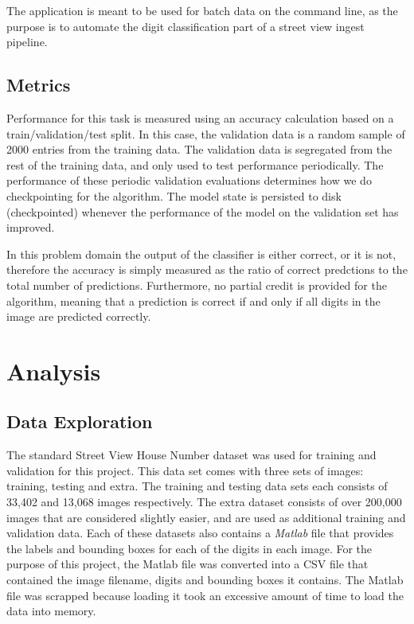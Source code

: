 \documentclass[12pt]{article}
\begin{document}
The application is meant to be used for batch data on the command line, as the purpose is to automate the digit classification part of a street view ingest pipeline.

\subsection{Metrics}
Performance for this task is measured using an accuracy calculation based on a train/validation/test split.
In this case, the validation data is a random sample of 2000 entries from the training data.
The validation data is segregated from the rest of the training data, and only used to test performance periodically.
The performance of these periodic validation evaluations determines how we do checkpointing for the algorithm.
The model state is persisted to disk (checkpointed) whenever the performance of the model on the validation set has improved.

In this problem domain the output of the classifier is either correct, or it is not, therefore the accuracy is simply measured as the ratio of correct predctions to the total number of predictions.
Furthermore, no partial credit is provided for the algorithm, meaning that a prediction is correct if and only if all digits in the image are predicted correctly.

\section{Analysis}
\subsection{Data Exploration} \label{sssec:data_exploration}
The standard Street View House Number dataset\cite{svhn_dataset} was used for training and validation for this project. 
This data set comes with three sets of images: training, testing and extra. 
The training and testing data sets each consists of 33,402 and 13,068 images respectively. 
The extra dataset consists of over 200,000 images that are considered slightly easier, and are used as additional training and validation data. 
Each of these datasets also contains a \textit{Matlab} file that provides the labels and bounding boxes for each of the digits in each image.
For the purpose of this project, the Matlab file was converted into a CSV file that contained the image filename, digits and bounding boxes it contains. 
The Matlab file was scrapped because loading it took an excessive amount of time to load the data into memory.
\end{document}
